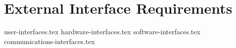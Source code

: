\chapter{External Interface Requirements} \label{chap:external_interface_requirements}

{user-interfaces.tex}
\newpage
{hardware-interfaces.tex}
\newpage
{software-interfaces.tex}
\newpage
{communications-interfaces.tex}
\newpage
